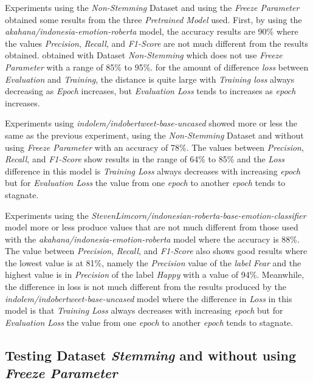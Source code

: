 Experiments using the \textit{Non-Stemming} Dataset and using the \textit{Freeze Parameter} obtained some results from the three \textit{Pretrained Model} used. First, by using the \textit{akahana/indonesia-emotion-roberta} model, the accuracy results are 90\% where the values \textit{Precision}, \textit{Recall}, and \textit{F1-Score} are not much different from the results obtained. obtained with Dataset \textit{Non-Stemming} which does not use \textit{Freeze Parameter} with a range of 85\% to 95\%. for the amount of difference \textit{loss} between \textit{Evaluation} and \textit{Training}, the distance is quite large with \textit{Training loss} always decreasing as \textit{Epoch} increases, but \textit{Evaluation Loss} tends to increases as \textit{epoch} increases.

Experiments using \textit{indolem/indobertweet-base-uncased} showed more or less the same as the previous experiment, using the \textit{Non-Stemming} Dataset and without using \textit{Freeze Parameter} with an accuracy of 78\%. The values between \textit{Precision}, \textit{Recall}, and \textit{F1-Score} show results in the range of 64\% to 85\% and the \textit{Loss} difference in this model is \textit{Training Loss} always decreases with increasing \textit{epoch} but for \textit{Evaluation Loss} the value from one \textit{epoch} to another \textit{epoch} tends to stagnate.

Experiments using the \textit{StevenLimcorn/indonesian-roberta-base-emotion-classifier} model more or less produce values that are not much different from those used with the \textit{akahana/indonesia-emotion-roberta} model where the accuracy is 88\%. The value between \textit{Precision}, \textit{Recall}, and \textit{F1-Score} also shows good results where the lowest value is at 81\%, namely the \textit{Precision} value of the \textit{ label Fear} and the highest value is in \textit{Precision} of the label \textit{Happy} with a value of 94\%. Meanwhile, the difference in loss is not much different from the results produced by the \textit{indolem/indobertweet-base-uncased} model where the difference in \textit{Loss} in this model is that \textit{Training Loss} always decreases with increasing \textit{epoch } but for \textit{Evaluation Loss} the value from one \textit{epoch} to another \textit{epoch} tends to stagnate.

\subsection{Testing Dataset \textit{Stemming} and without using \textit{Freeze Parameter}}

